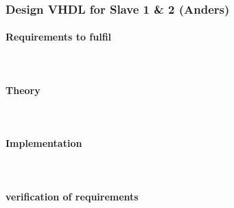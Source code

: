 




\subsubsection{Design VHDL for Slave 1 \& 2 (Anders)}
\paragraph{Requirements to fulfil}\mbox{}\\


\paragraph{Theory}\mbox{}\\


\paragraph{Implementation}\mbox{}\\


\paragraph{verification of requirements}\mbox{}\\


